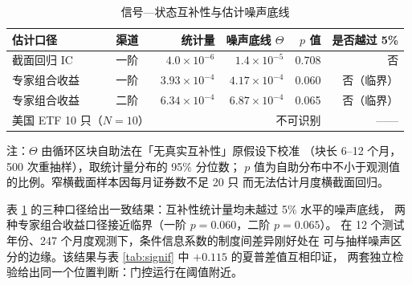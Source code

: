 \begin{table}[htbp]
\centering
\caption{信号—状态互补性与估计噪声底线}
\label{tab:gamma}
\begin{threeparttable}
\small
\begin{tabular}{llrrrr}
\toprule
估计口径 & 渠道 & 统计量 & 噪声底线 $\Theta$ & $p$ 值 & 是否越过 5\% \\
\midrule
截面回归 IC & 一阶 & $4.0\times10^{-6}$ & $1.4\times10^{-5}$ & 0.708 & 否 \\
专家组合收益 & 一阶 & $3.93\times10^{-4}$ & $4.17\times10^{-4}$ & 0.060 & 否（临界） \\
专家组合收益 & 二阶 & $6.34\times10^{-4}$ & $6.87\times10^{-4}$ & 0.065 & 否（临界） \\
\midrule
\multicolumn{2}{l}{美国 ETF 10 只（$N=10$）} & \multicolumn{3}{r}{不可识别} & —— \\
\bottomrule
\end{tabular}
\begin{tablenotes}[flushleft]\footnotesize
\item 注：$\Theta$ 由循环区块自助法在「无真实互补性」原假设下校准
（块长 6--12 个月，500 次重抽样），取统计量分布的 95\% 分位数；
$p$ 值为自助分布中不小于观测值的比例。窄横截面样本因每月证券数不足 20 只
而无法估计月度横截面回归。
\end{tablenotes}
\end{threeparttable}
\end{table}

表 \ref{tab:gamma} 的三种口径给出一致结果：互补性统计量均未越过 5\% 水平的噪声底线，
两种专家组合收益口径接近临界（一阶 $p=0.060$，二阶 $p=0.065$）。
在 12 个测试年份、247 个月度观测下，条件信息系数的制度间差异刚好处在
可与抽样噪声区分的边缘。该结果与表 \ref{tab:signif} 中 $+0.115$ 的夏普差值互相印证，
两套独立检验给出同一个位置判断：门控运行在阈值附近。


